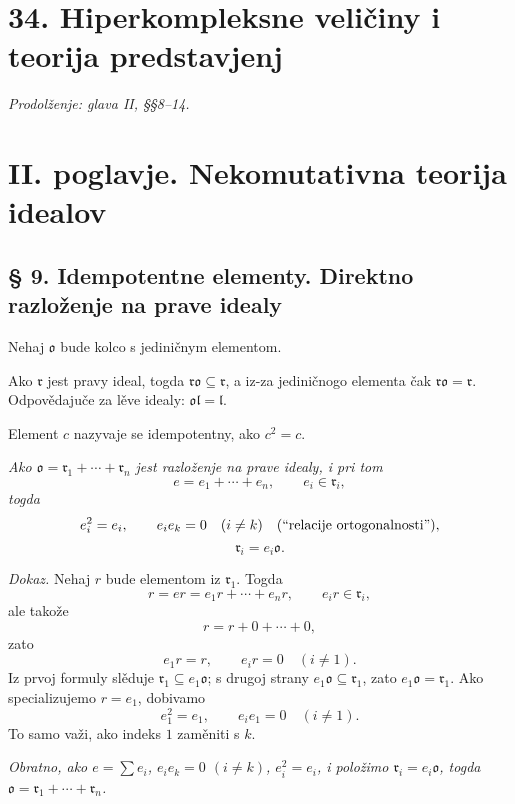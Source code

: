\documentclass[11pt]{article}
\providecommand{\ml}{\mathfrak{l}}
\providecommand{\mo}{\mathfrak{o}}
\providecommand{\mr}{\mathfrak{r}}
\begin{document}
\setcounter{footnote}{12}
\section*{34. Hiperkompleksne veličiny i teorija predstavjenj}
\emph{Prodolženje: glava II, §§8--14.}

\section*{II. poglavje. Nekomutativna teorija idealov}

\subsection*{§ 9. Idempotentne elementy. Direktno razloženje na prave idealy}

Nehaj $\mo$ bude kolco s jediničnym elementom.

Ako $\mr$ jest pravy ideal, togda $\mr\mo\subseteq\mr$, a iz-za jediničnogo elementa čak $\mr\mo=\mr$. Odpovědajuče za lěve idealy: $\mo\ml=\ml$.

Element $c$ nazyvaje se idempotentny, ako $c^2=c$.

\emph{Ako $\mo=\mr_1+\cdots+\mr_n$ jest razloženje na prave idealy, i pri tom}
\[
        e=e_1+\cdots+e_n,
        \qquad e_i\in\mr_i,
\]
\emph{togda}
\[
        e_i^2=e_i,
        \qquad e_i e_k=0\quad(i\ne k)
        \quad\hbox{(``relacije ortogonalnosti'')},
\]
\[
        \mr_i=e_i\mo.
\]

\emph{Dokaz.} Nehaj $r$ bude elementom iz $\mr_1$. Togda
\[
        r=er=e_1r+\cdots+e_nr,
        \qquad e_ir\in\mr_i,
\]
ale takože
\[
        r=r+0+\cdots+0,
\]
zato
\[
        e_1r=r,
        \qquad e_ir=0\quad(i\ne1).
\]
Iz prvoj formuly slěduje $\mr_1\subseteq e_1\mo$; s drugoj strany $e_1\mo\subseteq\mr_1$, zato $e_1\mo=\mr_1$. Ako specializujemo $r=e_1$, dobivamo
\[
        e_1^2=e_1,
        \qquad e_i e_1=0\quad(i\ne1).
\]
To samo važi, ako indeks $1$ zaměniti s $k$.

\emph{Obratno, ako $e=\sum e_i$, $e_i e_k=0$ $(i\ne k)$, $e_i^2=e_i$, i položimo $\mr_i=e_i\mo$, togda $\mo=\mr_1+\cdots+\mr_n$.}
\end{document}
